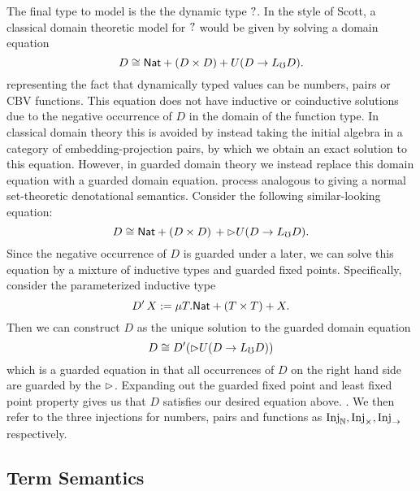 The final type to model is the the dynamic type $?$.  In the style
of Scott, a classical domain theoretic model for $?$ would be given
by solving a domain equation
%
\[ D \cong \mathsf{Nat} + (D \times D) + U(D \to L_\mho D). \]
%
representing the fact that dynamically typed values can be numbers,
pairs or CBV functions. This equation does not have inductive or
coinductive solutions due to the negative occurrence of $D$ in the
domain of the function type. In classical domain theory this is
avoided by instead taking the initial algebra in a category of
embedding-projection pairs, by which we obtain an exact solution to
this equation. However, in guarded domain theory we instead replace this domain equation with a guarded domain equation.
process analogous to giving a normal set-theoretic denotational semantics.
Consider the following similar-looking equation:
%
\[ D \cong \mathsf{Nat} + (D \times D)\, + {{\vartriangleright}} U(D \to L_\mho D). \]
%
Since the negative occurrence of $D$ is guarded under a later, we can
solve this equation by a mixture of inductive types and guarded fixed
points. Specifically, consider the parameterized inductive type
%
\[ D'\, X := \mu T. \mathsf{Nat} + (T \times T) + X. \]
%
Then we can construct $D$ as the unique solution to the guarded domain equation
\[ D \cong D'({{\vartriangleright}} U(D \to L_\mho D)) \]
which is a guarded equation in that all occurrences of $D$ on the right hand side are guarded by the ${{\vartriangleright}}$.
%
Expanding out the guarded fixed point and least fixed point property
gives us that $D$ satisfies our desired equation above. .
%
We then refer to the three injections for numbers, pairs and functions
as $\text{Inj}_\mathbb{N}, \text{Inj}_\times, \text{Inj}_\to$ respectively.

\subsection{Term Semantics}\label{sec:term-interpretation}

